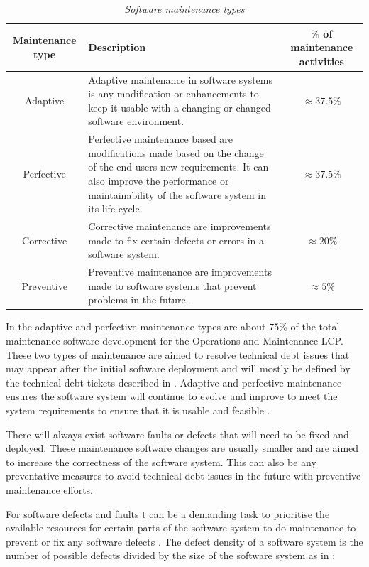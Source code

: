 \begin{table}[!htb]
	\centering
	\caption[Software maintenance types]
	{\textit{Software maintenance types \cite{Ping2010,Hasan2012}}}
	\label{tbl:ch1_maintenanceTypes}
	\begin{tabularx}{\textwidth}{|c|X|c|}
		\hline
		\textbf{Maintenance type} & \textbf{Description} & \textbf{$\%$ of maintenance activities} \\ \hline
		Adaptive & \raggedright Adaptive maintenance in software systems is any modification or enhancements to keep it usable with a changing or changed software environment. & $\approx 37.5\%$ \\ \hline
		Perfective & \raggedright Perfective maintenance based are modifications made based on the change of the end-users new requirements. It can also improve the performance or maintainability of the software system in its life cycle. & $\approx 37.5\%$ \\ \hline
		Corrective & \raggedright Corrective maintenance are improvements made to fix certain defects or errors in a software system. & $\approx 20\%$ \\ \hline
		Preventive & \raggedright  Preventive maintenance are improvements made to software systems that prevent problems in the future. & $\approx 5\%$ \\ \hline
	\end{tabularx}
\end{table}

In  the adaptive and perfective maintenance types are about $75\%$ of the total maintenance software development for the Operations and Maintenance LCP. These two types of maintenance are aimed to resolve technical debt issues that may appear after the initial software deployment and will mostly be defined by the technical debt tickets described in . Adaptive and perfective maintenance ensures the software system will continue to evolve and improve to meet the system requirements to ensure that it is usable and feasible \cite{Kumar2013}. \par There will always exist software faults or defects that will need to be fixed and deployed. These maintenance software changes are usually smaller and are aimed to increase the correctness of the software system. This can also be any preventative measures to avoid technical debt issues in the future with preventive maintenance efforts.\par For software defects and faults t can be a demanding task to prioritise the available resources for certain parts of the software system to do maintenance to prevent or fix any software defects \cite{Mamone1994, Hasan2012}.  The defect density of a software system is the number of possible defects divided by the size of the software system as in :

